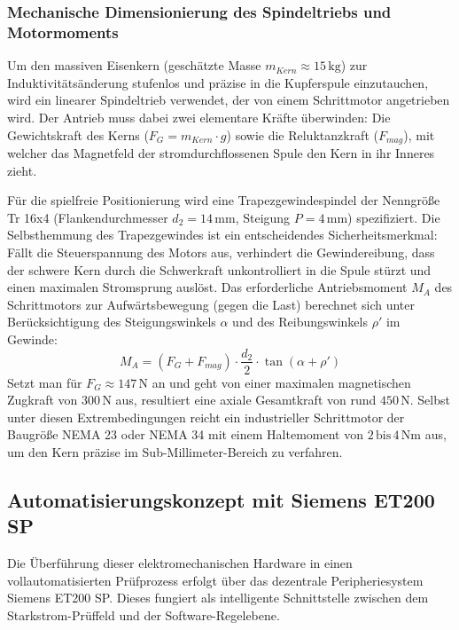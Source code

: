 \subsubsection{Mechanische Dimensionierung des Spindeltriebs und Motormoments}
\label{sec:mechanik_spindel}

Um den massiven Eisenkern (geschätzte Masse $m_{Kern} \approx 15\,\text{kg}$) zur Induktivitätsänderung stufenlos und präzise in die Kupferspule einzutauchen, wird ein linearer Spindeltrieb verwendet, der von einem Schrittmotor angetrieben wird. Der Antrieb muss dabei zwei elementare Kräfte überwinden: Die Gewichtskraft des Kerns ($F_G = m_{Kern} \cdot g$) sowie die Reluktanzkraft ($F_{mag}$), mit welcher das Magnetfeld der stromdurchflossenen Spule den Kern in ihr Inneres zieht.

Für die spielfreie Positionierung wird eine Trapezgewindespindel der Nenngröße Tr 16x4 (Flankendurchmesser $d_2 = 14\,\text{mm}$, Steigung $P = 4\,\text{mm}$) spezifiziert. Die Selbsthemmung des Trapezgewindes ist ein entscheidendes Sicherheitsmerkmal: Fällt die Steuerspannung des Motors aus, verhindert die Gewindereibung, dass der schwere Kern durch die Schwerkraft unkontrolliert in die Spule stürzt und einen maximalen Stromsprung auslöst.
Das erforderliche Antriebsmoment $M_A$ des Schrittmotors zur Aufwärtsbewegung (gegen die Last) berechnet sich unter Berücksichtigung des Steigungswinkels $\alpha$ und des Reibungswinkels $\rho'$ im Gewinde:
$$M_A = (F_G + F_{mag}) \cdot \frac{d_2}{2} \cdot \tan(\alpha + \rho')$$
Setzt man für $F_G \approx 147\,\text{N}$ an und geht von einer maximalen magnetischen Zugkraft von $300\,\text{N}$ aus, resultiert eine axiale Gesamtkraft von rund $450\,\text{N}$. Selbst unter diesen Extrembedingungen reicht ein industrieller Schrittmotor der Baugröße NEMA 23 oder NEMA 34 mit einem Haltemoment von $2\,\text{bis}\,4\,\text{Nm}$ aus, um den Kern präzise im Sub-Millimeter-Bereich zu verfahren.

\subsection{Automatisierungskonzept mit Siemens ET200 SP}
\label{sec:automatisierung_et200sp}

Die Überführung dieser elektromechanischen Hardware in einen vollautomatisierten Prüfprozess erfolgt über das dezentrale Peripheriesystem Siemens ET200 SP. Dieses fungiert als intelligente Schnittstelle zwischen dem Starkstrom-Prüffeld und der Software-Regelebene.

